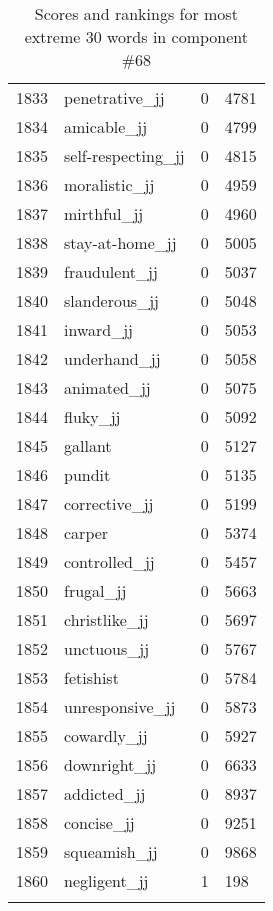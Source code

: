 \begin{longtable}[!htbp]{| rlr@{.}l |}
    1833 & penetrative\_jj & 0 & 4781 \\
    1834 & amicable\_jj & 0 & 4799 \\
    1835 & self-respecting\_jj & 0 & 4815 \\
    1836 & moralistic\_jj & 0 & 4959 \\
    1837 & mirthful\_jj & 0 & 4960 \\
    1838 & stay-at-home\_jj & 0 & 5005 \\
    1839 & fraudulent\_jj & 0 & 5037 \\
    1840 & slanderous\_jj & 0 & 5048 \\
    1841 & inward\_jj & 0 & 5053 \\
    1842 & underhand\_jj & 0 & 5058 \\
    1843 & animated\_jj & 0 & 5075 \\
    1844 & fluky\_jj & 0 & 5092 \\
    1845 & gallant & 0 & 5127 \\
    1846 & pundit & 0 & 5135 \\
    1847 & corrective\_jj & 0 & 5199 \\
    1848 & carper & 0 & 5374 \\
    1849 & controlled\_jj & 0 & 5457 \\
    1850 & frugal\_jj & 0 & 5663 \\
    1851 & christlike\_jj & 0 & 5697 \\
    1852 & unctuous\_jj & 0 & 5767 \\
    1853 & fetishist & 0 & 5784 \\
    1854 & unresponsive\_jj & 0 & 5873 \\
    1855 & cowardly\_jj & 0 & 5927 \\
    1856 & downright\_jj & 0 & 6633 \\
    1857 & addicted\_jj & 0 & 8937 \\
    1858 & concise\_jj & 0 & 9251 \\
    1859 & squeamish\_jj & 0 & 9868 \\
    1860 & negligent\_jj & 1 & 198 \\
    \hline
    \caption{Scores and rankings for most extreme 30 words in component \#68} \\
\end{longtable}
